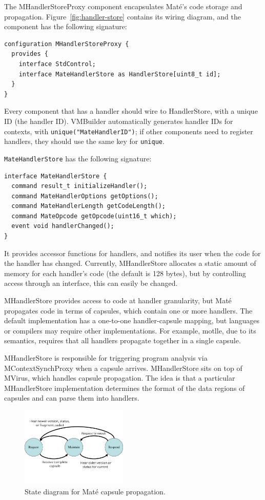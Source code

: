 \documentclass[12pt]{article}
\newcommand{\mate}{Mat\'{e}\xspace}
\begin{document}
The MHandlerStoreProxy component encapsulates \mate's code storage and
propagation. Figure~\ref{fig:handler-store} contains its wiring
diagram, and the component has the following signature:

{\scriptsize
\begin{verbatim}
configuration MHandlerStoreProxy {
  provides {
    interface StdControl;
    interface MateHandlerStore as HandlerStore[uint8_t id];
  }
}
\end{verbatim}
}

Every component that has a handler should wire to HandlerStore, with a
unique ID (the handler ID). VMBuilder automatically generates handler
IDs for contexts, with {\tt unique("MateHandlerID")}; if other
components need to register handlers, they should use the same key for
{\tt unique}.

{\tt MateHandlerStore} has the following signature:

{\scriptsize
\begin{verbatim}
interface MateHandlerStore {
  command result_t initializeHandler();
  command MateHandlerOptions getOptions();
  command MateHandlerLength getCodeLength();
  command MateOpcode getOpcode(uint16_t which);
  event void handlerChanged();
}
\end{verbatim}
}

It provides accessor functions for handlers, and notifies its user
when the code for the handler has changed. Currently, MHandlerStore
allocates a static amount of memory for each handler's code (the
default is 128 bytes), but by controlling access through an interface,
this can easily be changed.

MHandlerStore provides access to code at handler granularity, but
\mate propagates code in terms of capsules, which contain one or more
handlers. The default implementation has a one-to-one handler-capsule
mapping, but languages or compilers may require other
implementations. For example, motlle, due to its semantics, requires
that all handlers propagate together in a single capsule.

MHandlerStore is responsible for triggering program analysis via
MContextSynchProxy when a capsule arrives. MHandlerStore sits on top
of MVirus, which handles capsule propagation. The idea is that a
particular MHandlerStore implementation determines the format of the
data regions of capsules and can parse them into handlers.

\begin{figure}
\centering
\vspace*{-.5cm}
\includegraphics[width=2in]{fig/virus-states.jpg}
\vspace*{-.5cm}
\caption{State diagram for \mate capsule propagation.}
\label{fig:prog_state}
\end{figure}
\end{document}
